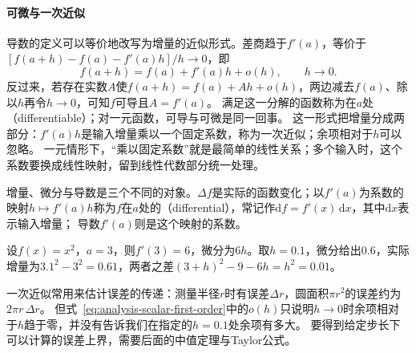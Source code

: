 \paragraph{可微与一次近似}
导数的定义可以等价地改写为增量的近似形式。差商趋于$f'(a)$，等价于$[f(a+h)-f(a)-f'(a)h]/h\to0$，即
\begin{equation}
 f(a+h)=f(a)+f'(a)h+o(h),\qquad h\to0.
 \label{eq:analysis-scalar-first-order}
\end{equation}
反过来，若存在实数$A$使$f(a+h)=f(a)+Ah+o(h)$，两边减去$f(a)$、除以$h$再令$h\to0$，可知$f$可导且$A=f'(a)$。
满足这一分解的函数称为在$a$处（differentiable）；对一元函数，可导与可微是同一回事。
这一形式把增量分成两部分：$f'(a)h$是输入增量乘以一个固定系数，称为一次近似；余项相对于$h$可以忽略。
一元情形下，“乘以固定系数”就是最简单的线性关系；多个输入时，这个系数要换成线性映射，留到线性代数部分统一处理。

增量、微分与导数是三个不同的对象。$\Delta f$是实际的函数变化；以$f'(a)$为系数的映射$h\mapsto f'(a)h$称为$f$在$a$处的（differential），常记作$\mathrm df=f'(x)\,\mathrm dx$，其中$\mathrm dx$表示输入增量；
导数$f'(a)$则是这个映射的系数。
\begin{example}[平方函数在$a=3$处的微分]
\label{ex:analysis-square-differential}
设$f(x)=x^2$，$a=3$，则$f'(3)=6$，微分为$6h$。取$h=0.1$，微分给出$0.6$，实际增量为$3.1^2-3^2=0.61$，两者之差$(3+h)^2-9-6h=h^2=0.01$。
\end{example}
一次近似常用来估计误差的传递：测量半径$r$时有误差$\Delta r$，圆面积$\pi r^2$的误差约为$2\pi r\,\Delta r$。
但式~\eqref{eq:analysis-scalar-first-order}中的$o(h)$只说明$h\to0$时余项相对于$h$趋于零，并没有告诉我们在指定的$h=0.1$处余项有多大。
要得到给定步长下可以计算的误差上界，需要后面的中值定理与Taylor公式。
